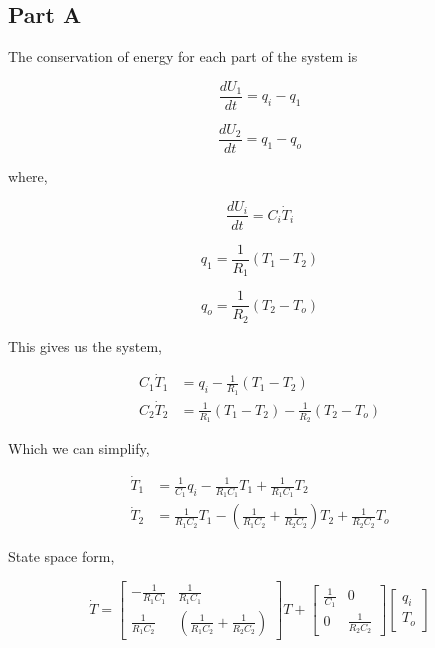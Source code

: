 \documentclass[12pt]{article}
\numberwithin{equation}{subsection}
\newcommand\ddfrac[2]{\frac{\displaystyle #1}{\displaystyle #2}}
\begin{document}
  \subsection{Part A}

  The conservation of energy for each part of the system is

  \begin{equation}
    \frac{dU_1}{dt} = q_i - q_1
  \end{equation}

  \begin{equation}
    \frac{dU_2}{dt} = q_1 - q_o
  \end{equation}

  where,

  \begin{equation}
    \frac{dU_i}{dt} = C_i \dot T_i
  \end{equation}

  \begin{equation}
    q_1 = \frac{1}{R_1} (T_1 - T_2)
  \end{equation}

  \begin{equation}
    q_o = \frac{1}{R_2} (T_2 - T_o)
  \end{equation}

  This gives us the system,

  \begin{equation}
    \begin{aligned}
      C_1 \dot T_1 &= q_i - \frac{1}{R_1} (T_1 - T_2) \\
      C_2 \dot T_2 &= \frac{1}{R_1} (T_1 - T_2) - \frac{1}{R_2} (T_2 - T_o)
    \end{aligned}
  \end{equation}

  Which we can simplify,

  \begin{equation}
    \begin{aligned}
      \dot T_1 &= \frac{1}{C_1}q_i - \frac{1}{R_1C_1}T_1 + \frac{1}{R_1C_1}T_2 \\
      \dot T_2 &= \frac{1}{R_1C_2}T_1 - \left( \frac{1}{R_1C_2} + \frac{1}{R_2C_2} \right)T_2 + \frac{1}{R_2C_2}T_o
    \end{aligned}
  \end{equation}

  State space form,

  \begin{equation}
    \dot T =
    \begin{bmatrix}
      - \ddfrac{1}{R_1C_1} & \ddfrac{1}{R_1C_1} \\
      \ddfrac{1}{R_1C_2} & \left( \ddfrac{1}{R_1C_2} + \ddfrac{1}{R_2C_2} \right)
    \end{bmatrix} T +
    \begin{bmatrix}
      \ddfrac{1}{C_1} & 0 \\ 0 & \ddfrac{1}{R_2C_2}
    \end{bmatrix}
    \begin{bmatrix}
      q_i \\ T_o
    \end{bmatrix}
  \end{equation}
\end{document}
